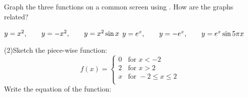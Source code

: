 \begin{Exercise}[title={Functions},label=ex12]
\Question Graph the three functions on a common screen using \desmos. How are the graphs related? 
\begin{tasks}
	\task 	$y =x^{2} ,\text{\quad \quad }y = -x^{2} ,\text{\quad \quad }y =x^{2} \sin  x$  %
	\task   $y =e^{x} ,\text{\quad \quad }y = -e^{x} ,\text{\quad \quad }y =e^{x} \sin  5 \pi  x$ %
\end{tasks}
\Question \begin{tasks}(2)\task Sketch the piece-wise function:\\
\[
f(x) = \begin{cases} 
0 & \mbox{for }x<-2 \\ 
2 & \mbox{for } x>2 \\ 
x& \mbox{for }-2\leq x \leq 2 \\
\end{cases}
\]
\task Write the equation of the function:\\
\end{tasks}
\end{Exercise}%
